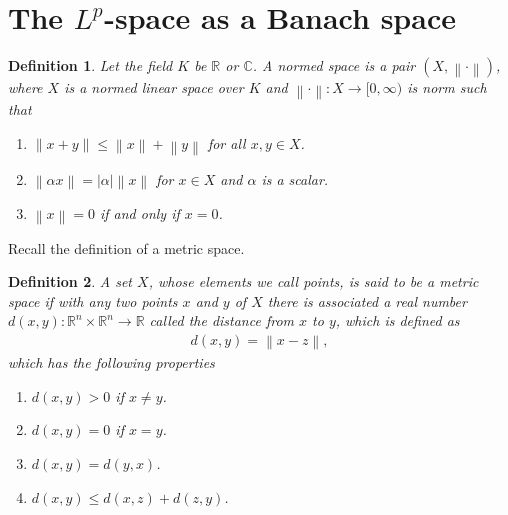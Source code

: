 \documentclass[11pt]{book}
\newtheorem{definition}{Definition}[chapter]
\theoremstyle{definition}
\numberwithin{equation}{chapter}
\begin{document}
\medskip

\section{The $L^p$-space as a Banach space}

\begin{definition}\label{def_44}
Let the field $K$ be $\mathbb{R}$ or $\mathbb{C}$. A normed space is a pair $(X, \left\|\cdot\right\|)$, where $X$ is a normed linear space over $K$ and $\left\|\cdot\right\|: X \to [0,\infty)$ is norm such that
\begin{enumerate}[label=(\alph*)]
    \item $\left\|x + y\right\| \leq \left\|x\right\| + \left\|y\right\|$ for all $x,y \in X$.\label{def_44_a}
    
    \item $\left\|\alpha x\right\| = \left|\alpha\right| \left\|x\right\|$ for $x \in X$ and $\alpha$ is a scalar.\label{def_44_b}
    
    \item $\left\|x\right\| = 0$ if and only if $x = 0$.\label{def_44_c}
\end{enumerate}
\end{definition}

\medskip

Recall the definition of a metric space.

\medskip

\begin{definition}
A set $X$, whose elements we call points, is said to be a metric space if with any two points $x$ and $y$ of $X$ there is associated a real number $d(x,y): \mathbb{R}^n \times \mathbb{R}^n \rightarrow \mathbb{R}$ called the distance from $x$ to $y$, which is defined as 
\begin{align*}
    d(x,y) = \left\|x - z\right\|,
\end{align*}
which has the following properties
\begin{enumerate}[label=(\alph*)]
    \item $d(x,y) > 0$ if $x\neq y$.
    \item $d(x,y) = 0$ if $x = y$.
    \item $d(x,y) = d(y,x)$.
    \item $d(x,y) \leq d(x,z) + d(z,y)$.
\end{enumerate}
\end{definition}

\medskip
\end{document}
